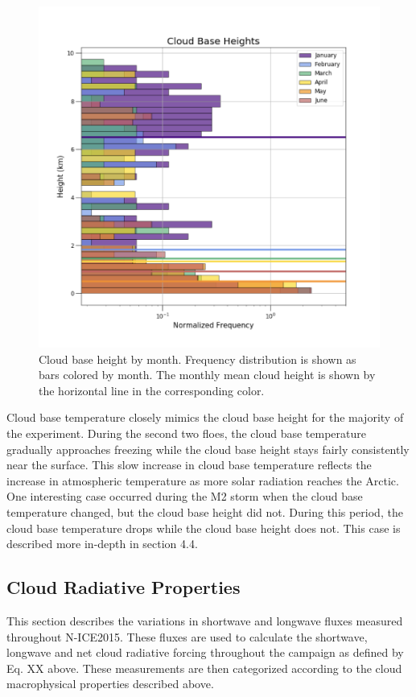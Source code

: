 \begin{figure}[H]
    \centering
    \includegraphics[width=0.75\linewidth]{figures/chapter4/ch2_f5.png}
    \caption[Cloud base height by month.]{Cloud base height by month. Frequency distribution is shown as bars colored by month. The monthly mean cloud height is shown by the horizontal line in the corresponding color.}
    \label{fig:cloudbase}
\end{figure}

Cloud base temperature closely mimics the cloud base height for the majority of the experiment. During the second two floes, the cloud base temperature gradually approaches freezing while the cloud base height stays fairly consistently near the surface. This slow increase in cloud base temperature reflects the increase in atmospheric temperature as more solar radiation reaches the Arctic. One interesting case occurred during the M2 storm when the cloud base temperature changed, but the cloud base height did not. During this period, the cloud base temperature drops while the cloud base height does not. This case is described more in-depth in section 4.4.

\subsection{Cloud Radiative Properties}

This section describes the variations in shortwave and longwave fluxes measured throughout N-ICE2015. These fluxes are used to calculate the shortwave, longwave and net cloud radiative forcing throughout the campaign as defined by Eq. XX above. These measurements are then categorized according to the cloud macrophysical properties described above.

